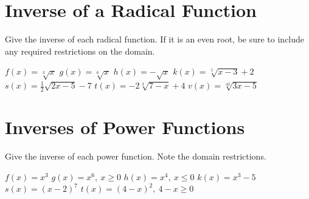 \section*{Inverse of a Radical Function}
Give the inverse of each radical function.  If it is an even root, be sure to include any required restrictions on the domain.
\begin{smenum}
\mitemxxxx
{$f(x)=\sqrt[3]{x}$}
{$g(x)=\sqrt[6]{x}$}
{$h(x)=-\sqrt{x}$}
{$k(x)=\sqrt[5]{x-3}+2$}
\mitemxxx
{$s(x)=\frac{1}{2}\sqrt{2x-5}-7$}
{$t(x)=-2\sqrt[3]{7-x}+4$}
{$v(x)=\sqrt[42]{3x-5}$}
\end{smenum}

\section*{Inverses of Power Functions}
Give the inverse of each power function.  Note the domain restrictions.
\begin{smenum}
\mitemxxx
{$f(x)=x^3$}
{$g(x)=x^6,~x\geq 0$}
{$h(x)=x^4,~x\leq 0$}
\mitemxxx
{$k(x)=x^3-5$}
{$s(x)=(x-2)^7$}
{$t(x)=(4-x)^2,~4-x\geq 0$}
\end{smenum}


